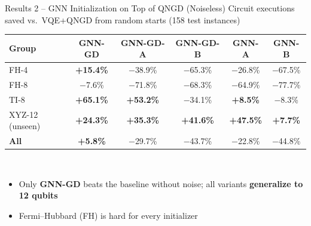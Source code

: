 \documentclass[aspectratio=169,11pt]{beamer}
\newcommand{\up}[1]{\textcolor{GoodGreen}{\textbf{#1}}}
\newcommand{\dn}[1]{\textcolor{BadRed}{#1}}
\begin{document}
\begin{frame}{Results 2 -- GNN Initialization on Top of QNGD (Noiseless)}
  \centering\small
  Circuit executions saved vs.\ VQE+QNGD from random starts (158 test instances)\\[2mm]
  \begin{tabular}{lccccc}
    \toprule
    Group & GNN-GD & GNN-GD-A & GNN-GD-B & GNN-A & GNN-B \\
    \midrule
    FH-4   & \up{+15.4\%} & \dn{$-$38.9\%} & \dn{$-$65.3\%} & \dn{$-$26.8\%} & \dn{$-$67.5\%} \\
    FH-8   & \dn{$-$7.6\%} & \dn{$-$71.8\%} & \dn{$-$68.3\%} & \dn{$-$64.9\%} & \dn{$-$77.7\%} \\
    TI-8   & \up{+65.1\%} & \up{+53.2\%} & \dn{$-$34.1\%} & \up{+8.5\%} & \dn{$-$8.3\%} \\
    XYZ-12 (unseen) & \up{+24.3\%} & \up{+35.3\%} & \up{+41.6\%} & \up{+47.5\%} & \up{+7.7\%} \\
    \midrule
    \textbf{All} & \up{+5.8\%} & \dn{$-$29.7\%} & \dn{$-$43.7\%} & \dn{$-$22.8\%} & \dn{$-$44.8\%} \\
    \bottomrule
  \end{tabular}\\[3mm]
  \raggedright
  \begin{itemize}\small
    \item Only \textbf{GNN-GD} beats the baseline without noise; all variants \textbf{generalize to 12 qubits}
    \item Fermi--Hubbard (FH) is hard for every initializer
  \end{itemize}
\end{frame}
\end{document}
